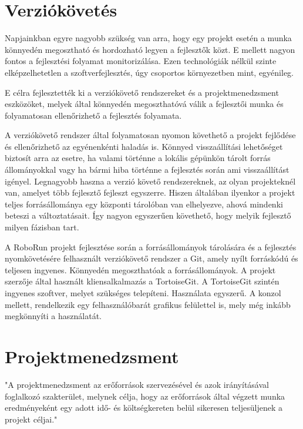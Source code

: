 \section{Verziókövetés}

Napjainkban egyre nagyobb szükség van arra, hogy egy projekt esetén a munka könnyedén megosztható és hordozható legyen a fejlesztők közt. E mellett nagyon fontos a fejlesztési folyamat monitorizálása. Ezen technológiák nélkül szinte elképzelhetetlen a szoftverfejlesztés, úgy csoportos környezetben mint, egyénileg.

	E célra fejlesztették  ki a verziókövető rendszereket és a projektmenedzsment eszközöket, melyek által könnyedén megoszthatóvá válik a fejlesztői munka és folyamatosan ellenőrizhető a fejlesztés folyamata.  
	
	A verziókövető rendszer által  folyamatosan nyomon követhető a projekt fejlődése és ellenőrizhető az egyénenkénti haladás is. Könnyed visszaállítási lehetőséget biztosít arra az esetre, ha valami történne a lokális gépünkön tárolt forrás állományokkal vagy ha bármi hiba történne a fejlesztés során ami visszaállítást igényel. Legnagyobb haszna a verzió követő rendszereknek, az olyan projekteknél van, amelyet több fejlesztő fejleszt egyszerre. Hiszen általában ilyenkor a projekt teljes forrásállománya egy központi tárolóban van elhelyezve, ahová mindenki beteszi a változtatásait. Így nagyon egyszerűen követhető, hogy melyik fejlesztő milyen fázisban tart. 
	
	A RoboRun projekt fejlesztése során a forrásállományok tárolására és a fejlesztés nyomkövetésére felhasznált verziókövető rendszer a Git\citep{git}, amely nyílt forráskódú és teljesen ingyenes. Könnyedén megoszthatóak a forrásállományok. A projekt szerzője által használt kliensalkalmazás a  TortoiseGit\citep{tortoisegit}. A TortoiseGit szintén ingyenes szoftver, melyet szükséges telepíteni. Használata egyszerű. A konzol mellett, rendelkezik egy felhasználóbarát grafikus felülettel is, mely még inkább megkönnyíti a használatát.

\section{Projektmenedzsment}

"A projektmenedzsment az erőforrások szervezésével és azok irányításával foglalkozó szakterület, melynek célja, hogy az erőforrások által végzett munka eredményeként egy adott idő- és költségkereten belül sikeresen teljesüljenek a projekt céljai."\cite{projektmenedzsment}

